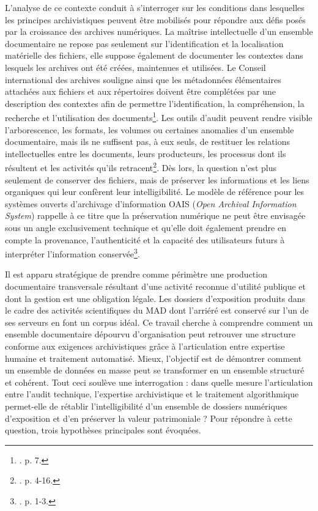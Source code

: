 L’analyse de ce contexte conduit à s’interroger sur les conditions dans lesquelles les principes archivistiques peuvent être mobilisés pour répondre aux défis posés par la croissance des archives numériques. La maîtrise intellectuelle d’un ensemble documentaire ne repose pas seulement sur l’identification et la localisation matérielle des fichiers, elle suppose également de documenter les contextes dans lesquels les archives ont été créées, maintenues et utilisées. Le Conseil international des archives souligne ainsi que les métadonnées élémentaires attachées aux fichiers et aux répertoires doivent être complétées par une description des contextes afin de permettre l’identification, la compréhension, la recherche et l’utilisation des documents\footnote{\cite{ric-fad-2023}. p. 7.}. Les outils d’audit peuvent rendre visible l’arborescence, les formats, les volumes ou certaines anomalies d’un ensemble documentaire, mais ils ne suffisent pas, à eux seuls, de restituer les relations intellectuelles entre les documents, leurs producteurs, les processus dont ils résultent et les activités qu’ils retracent\footnote{\cite{ric-fad-2023}. p. 4-16.}. Dès lors, la question n’est plus seulement de conserver des fichiers, mais de préserver les informations et les liens organiques qui leur confèrent leur intelligibilité. Le modèle de référence pour les systèmes ouverts d’archivage d’information OAIS (\textit{Open Archival Information System}) rappelle à ce titre que la préservation numérique ne peut être envisagée sous un angle exclusivement technique et qu’elle doit également prendre en compte la provenance, l’authenticité et la capacité des utilisateurs futurs à interpréter l’information conservée\footnote{\cite{oais-2024}. p. 1-3.}.

 Il est apparu stratégique de prendre comme périmètre une production documentaire transversale résultant d’une activité reconnue d'utilité publique et dont la gestion est une obligation légale. Les dossiers d’exposition produits dans le cadre des activités scientifiques du MAD dont l'arriéré est conservé sur l’un de ses serveurs en font un corpus idéal. Ce travail cherche à comprendre comment un ensemble documentaire dépourvu d'organisation peut retrouver une structure conforme aux exigences archivistiques grâce à l’articulation entre expertise humaine et traitement automatisé. Mieux, l’objectif est de démontrer comment un ensemble de données en masse peut se transformer en un ensemble structuré et cohérent. Tout ceci soulève une interrogation : dans quelle mesure l’articulation entre l’audit technique, l’expertise archivistique et le traitement algorithmique permet-elle de rétablir l’intelligibilité d’un ensemble de dossiers numériques d’exposition et d’en préserver la valeur patrimoniale ? Pour répondre à cette question, trois hypothèses principales sont évoquées.
 
